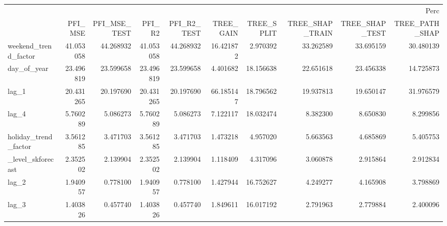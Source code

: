 \begin{tabular}{lrrrrrrrrr}
\toprule
 & \multicolumn{9}{r}{Perc} \\
 & PFI_MSE & PFI_MSE_TEST & PFI_R2 & PFI_R2_TEST & TREE_GAIN & TREE_SPLIT & TREE_SHAP_TRAIN & TREE_SHAP_TEST & TREE_PATH_SHAP \\
\midrule
weekend_trend_factor & 41.053058 & 44.268932 & 41.053058 & 44.268932 & 16.421872 & 2.970392 & 33.262589 & 33.695159 & 30.480139 \\
day_of_year & 23.496819 & 23.599658 & 23.496819 & 23.599658 & 4.401682 & 18.156638 & 22.651618 & 23.456338 & 14.725873 \\
lag_1 & 20.431265 & 20.197690 & 20.431265 & 20.197690 & 66.185147 & 18.796562 & 19.937813 & 19.650147 & 31.976579 \\
lag_4 & 5.760289 & 5.086273 & 5.760289 & 5.086273 & 7.122117 & 18.032474 & 8.382300 & 8.650830 & 8.299856 \\
holiday_trend_factor & 3.561285 & 3.471703 & 3.561285 & 3.471703 & 1.473218 & 4.957020 & 5.663563 & 4.685869 & 5.405753 \\
_level_skforecast & 2.352502 & 2.139904 & 2.352502 & 2.139904 & 1.118409 & 4.317096 & 3.060878 & 2.915864 & 2.912834 \\
lag_2 & 1.940957 & 0.778100 & 1.940957 & 0.778100 & 1.427944 & 16.752627 & 4.249277 & 4.165908 & 3.798869 \\
lag_3 & 1.403826 & 0.457740 & 1.403826 & 0.457740 & 1.849611 & 16.017192 & 2.791963 & 2.779884 & 2.400096 \\
\bottomrule
\end{tabular}
